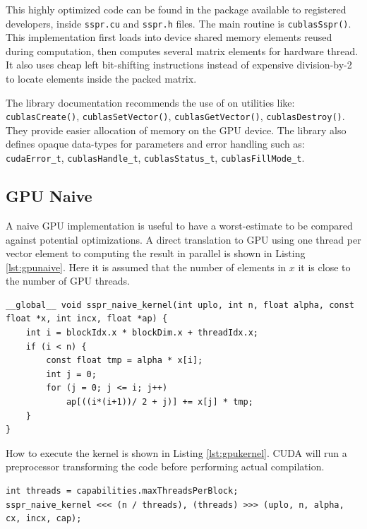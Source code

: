 \documentclass{llncs}
\begin{document}
This highly optimized code can be found in the package available to registered developers,
inside {\tt sspr.cu} and {\tt sspr.h} files. The main routine is {\tt cublasSspr()}. 
This implementation first loads into device shared memory elements reused during computation, then computes several matrix elements for hardware thread. It also uses cheap left bit-shifting instructions instead of expensive division-by-2 to locate elements inside the packed matrix.

\smallskip

The library documentation recommends the use of on utilities like: {\tt cublasCreate()}, {\tt cublasSetVector()},
{\tt cublasGetVector()}, {\tt cublasDestroy()}. They provide easier allocation of memory on the GPU device.
The library also defines opaque data-types for parameters and error handling such as: {\tt cudaError\_t},
{\tt cublasHandle\_t}, {\tt cublasStatus\_t}, {\tt cublasFillMode\_t}.

\subsection{GPU Naive}

A naive GPU implementation is useful to have a worst-estimate to be compared against potential optimizations.
A direct translation to GPU using one thread per vector element to computing the result in parallel is shown in Listing \ref{lst:gpunaive}. Here it is assumed that the number of elements in $ x $ it is close to the number of GPU threads.

\begin{lstlisting}[caption={Naive SSPR GPU Implementation},label={lst:gpunaive}]
__global__ void sspr_naive_kernel(int uplo, int n, float alpha, const float *x, int incx, float *ap) {
	int i = blockIdx.x * blockDim.x + threadIdx.x;
	if (i < n) {
		const float tmp = alpha * x[i];
		int j = 0;
		for (j = 0; j <= i; j++)
			ap[((i*(i+1))/ 2 + j)] += x[j] * tmp;
	}
}
\end{lstlisting}

How to execute the kernel is shown in Listing \ref{lst:gpukernel}. CUDA will run a preprocessor transforming the code before performing actual compilation.

\begin{lstlisting}[caption={GPU Kernel execution},label={lst:gpukernel}]
int threads = capabilities.maxThreadsPerBlock;
sspr_naive_kernel <<< (n / threads), (threads) >>> (uplo, n, alpha, cx, incx, cap);
\end{lstlisting}
\end{document}

